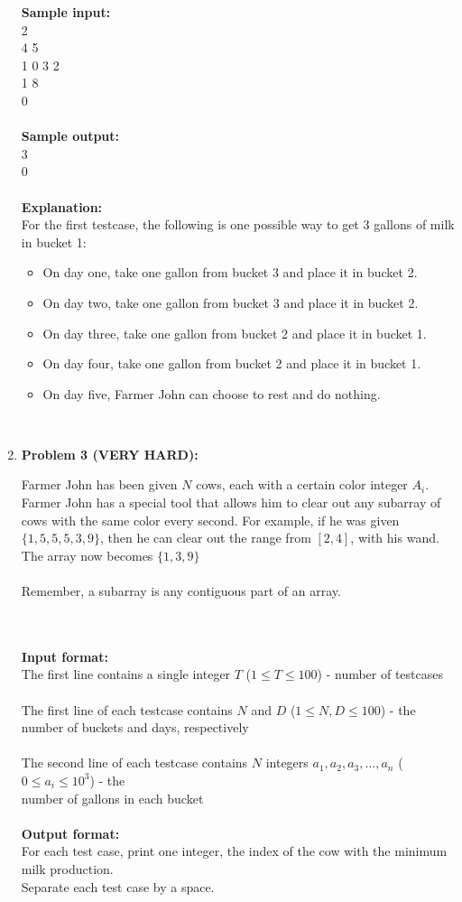 \documentclass[11pt]{article}
\begin{document}
\begin{enumerate}
\textbf{Sample input:}
\\
2\\
4 5\\
1 0 3 2\\
1 8\\
0
\\
\\
\textbf{Sample output:}
\\
3\\
0\\
\\
\textbf{Explanation:}
\\
For the first testcase, the following is one possible way to get 3 gallons of milk in bucket 1:
\begin{itemize}
    \item On day one, take one gallon from bucket 3 and place it in bucket 2.
    \item On day two, take one gallon from bucket 3 and place it in bucket 2.
    \item On day three, take one gallon from bucket 2 and place it in bucket 1.
    \item On day four, take one gallon from bucket 2 and place it in bucket 1.
    \item On day five, Farmer John can choose to rest and do nothing. 
\end{itemize}
\\
\pagebreak

\item
\textbf{Problem 3 (VERY HARD):}

Farmer John has been given $N$ cows, each with a certain color integer $A_i$. Farmer John has a special tool that allows him to clear out any subarray of cows with the same color every second. For example, if he was given $\{1, 5, 5, 5, 3, 9\}$, then he can clear out the range from $[2, 4]$, with his wand. The array now becomes $\{1, 3, 9\}$\\\\
Remember, a subarray is any contiguous part of an array. 

\\
\\
\textbf{Input format:}\\
The first line contains a single integer $T$ ($1 \leq T \leq 100$) - number of testcases\\\\
The first line of each testcase contains $N$ and $D$ ($1 \leq N, D \leq 100$) - the number of buckets and days, respectively\\\\
The second line of each testcase contains $N$ integers $a_1, a_2, a_3, ..., a_n$ ($0 \leq a_i \leq 10^3$) - the \\number of gallons in each bucket
\\\\
\textbf{Output format:}\\
For each test case, print one integer, the index of the cow with the minimum milk production. \\Separate each test case by a space.\\


\end{enumerate}
\end{document}
